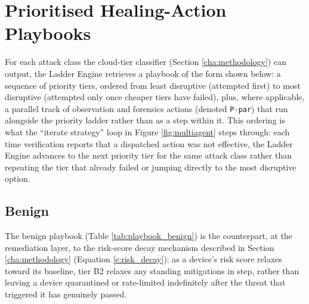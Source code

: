 \section{Prioritised Healing-Action Playbooks}\label{app:playbooks}

For each attack class the cloud-tier classifier (Section \ref{cha:methodology}) can output, the Ladder Engine retrieves a playbook of the form shown below: a sequence of priority tiers, ordered from least disruptive (attempted first) to most disruptive (attempted only once cheaper tiers have failed), plus, where applicable, a parallel track of observation and forensics actions (denoted \texttt{P-par}) that run alongside the priority ladder rather than as a step within it. This ordering is what the ``iterate strategy'' loop in Figure \ref{fig:multiagent} steps through: each time verification reports that a dispatched action was not effective, the Ladder Engine advances to the next priority tier for the same attack class rather than repeating the tier that already failed or jumping directly to the most disruptive option.

\subsection{Benign}

The benign playbook (Table \ref{tab:playbook_benign}) is the counterpart, at the remediation layer, to the risk-score decay mechanism described in Section \ref{cha:methodology} (Equation \ref{e:risk_decay}): as a device's risk score relaxes toward its baseline, tier B2 relaxes any standing mitigations in step, rather than leaving a device quarantined or rate-limited indefinitely after the threat that triggered it has genuinely passed.

